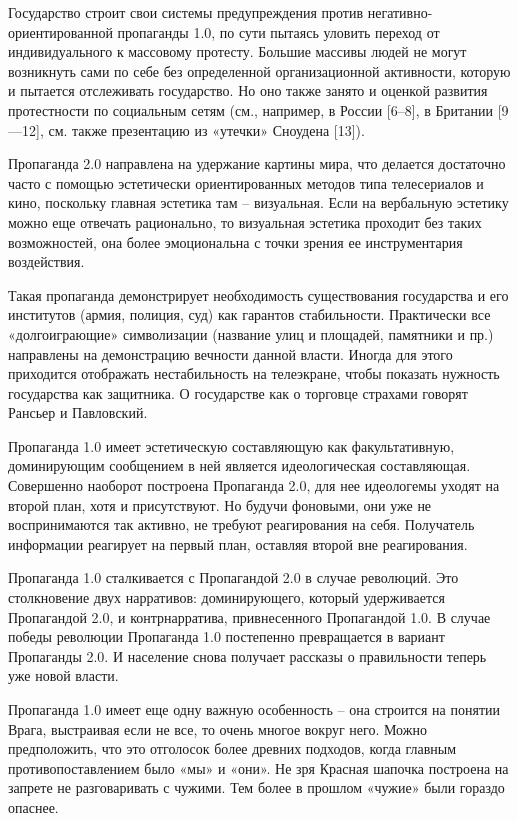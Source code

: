 Государство строит свои системы предупреждения против негативно-ориентированной
пропаганды 1.0, по сути пытаясь уловить переход от индивидуального к массовому
протесту. Большие массивы людей не могут возникнуть сами по себе без
определенной организационной активности, которую и пытается отслеживать
государство. Но оно также занято и оценкой развития протестности по социальным
сетям (см., например, в России [6–8], в Британии [9—12], см. также презентацию
из «утечки» Сноудена [13]).

Пропаганда 2.0 направлена на удержание картины мира, что делается достаточно
часто с помощью эстетически ориентированных методов типа телесериалов и кино,
поскольку главная эстетика там – визуальная. Если на вербальную эстетику можно
еще отвечать рационально, то визуальная эстетика проходит без таких
возможностей, она более эмоциональна с точки зрения ее инструментария
воздействия.

Такая пропаганда демонстрирует необходимость существования государства и его
институтов (армия, полиция, суд) как гарантов стабильности. Практически все
«долгоиграющие» символизации (название улиц и площадей, памятники и пр.)
направлены на демонстрацию вечности данной власти. Иногда для этого приходится
отображать нестабильность на телеэкране, чтобы показать нужность государства
как защитника. О государстве как о торговце страхами говорят Рансьер и
Павловский.

Пропаганда 1.0 имеет эстетическую составляющую как факультативную, доминирующим
сообщением в ней является идеологическая составляющая. Совершенно наоборот
построена Пропаганда 2.0, для нее идеологемы уходят на второй план, хотя и
присутствуют. Но будучи фоновыми, они уже не воспринимаются так активно, не
требуют реагирования на себя. Получатель информации реагирует на первый план,
оставляя второй вне реагирования.

Пропаганда 1.0 сталкивается с Пропагандой 2.0 в случае революций. Это
столкновение двух нарративов: доминирующего, который удерживается Пропагандой
2.0, и контрнарратива, привнесенного Пропагандой 1.0. В случае победы революции
Пропаганда 1.0 постепенно превращается в вариант Пропаганды 2.0. И население
снова получает рассказы о правильности теперь уже новой власти.

Пропаганда 1.0 имеет еще одну важную особенность – она строится на понятии
Врага, выстраивая если не все, то очень многое вокруг него. Можно предположить,
что это отголосок более древних подходов, когда главным противопоставлением
было «мы» и «они». Не зря Красная шапочка построена на запрете не разговаривать
с чужими. Тем более в прошлом «чужие» были гораздо опаснее.

